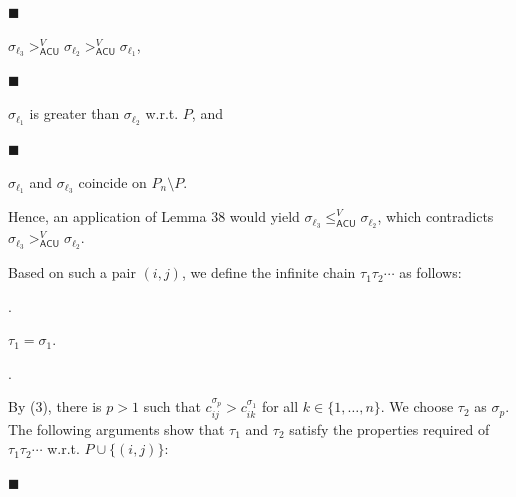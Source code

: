 \documentclass[10pt,a4paper]{amsart}
\begin{document}
\par\noindent  $\blacksquare$ 
 
$\sigma_{\ell_{3}}>_{\mathsf{ACU}}^{V}\sigma_{\ell_{2}}>_{\mathsf{ACU}}^{V}%
\sigma_{\ell_{1}}$,\par
 
 
 
\par\noindent  $\blacksquare$ 
 
$\sigma_{\ell_{1}}$ is greater than $\sigma_{\ell_{2}}$ w.r.t. $P$, and\par
 
 
 
\par\noindent  $\blacksquare$ 
 
$\sigma_{\ell_{1}}$ and $\sigma_{\ell_{3}}$ coincide on $P_{n}\setminus P$.\par
 
 
  
Hence, an application of Lemma 38 would yield $\sigma_{\ell_{3}}\leq_{\mathsf{ACU}}^{V}\sigma_{\ell_{2}}$, which contradicts $\sigma_{\ell_{3}}>_{\mathsf{ACU}}^{V}\sigma_{\ell_{2}}$.\par
 
 
 
Based on such a pair $(i,j)$, we define the infinite chain $\tau_{1}\tau_{2}\cdots$ as follows:\par
  
\par{}. 
 
$\tau_{1}=\sigma_{1}$.\par
 
 
 
\par{}. 
 
By (3), there is $p>1$ such that $c^{\sigma_{p}}_{ij}>c^{\sigma_{1}}_{ik}$ for all $k\in\{1,\ldots,n\}$. We choose $\tau_{2}$ as $\sigma_{p}$. The following arguments show that $\tau_{1}$ and $\tau_{2}$ satisfy the properties required of $\tau_{1}\tau_{2}\cdots$ w.r.t. $P\cup\{(i,j)\}$:\par
  
\par\noindent  $\blacksquare$ 
 
\end{document}
